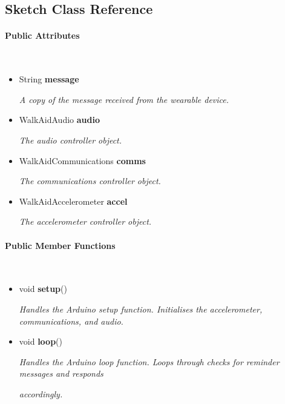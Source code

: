 \subsection{Sketch Class Reference}
\label{subsec:sketch_walking_aid}\mbox{}

    \paragraph{Public Attributes}\mbox{}\\

        \begin{itemize}
            \item String \textbf{message}
            
                \quad \quad \textit{A copy of the message received from the wearable device.}

            \item WalkAidAudio \textbf{audio}
            
                \quad \quad \textit{The audio controller object.}

            \item WalkAidCommunications \textbf{comms}
            
                \quad \quad \textit{The communications controller object.}
                
            \item WalkAidAccelerometer \textbf{accel}
            
                \quad \quad \textit{The accelerometer controller object.}\\

        \end{itemize}


    \paragraph{Public Member Functions}\mbox{}\\

        \begin{itemize}
            \item void \textbf{setup}() 
            
                \quad \quad \textit{Handles the Arduino setup function. Initialises the accelerometer, communications, and audio.}

            \item void \textbf{loop}() 
            
                \quad \quad \textit{Handles the Arduino loop function. Loops through checks for reminder messages and responds }
                
                \quad \quad \textit{accordingly.}\\
        \end{itemize}



